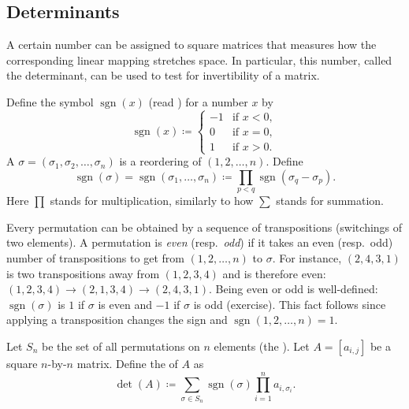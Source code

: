 \subsection{Determinants}

A certain number can be assigned to square matrices that measures
how the corresponding linear mapping stretches space.  In particular,
this number, called the determinant, can be used to test for invertibility of a matrix.

Define the symbol
$\operatorname{sgn}(x)$ (read ) for a number $x$ by
\begin{equation*}
\operatorname{sgn}(x)
\coloneqq
\begin{cases}
-1 & \text{if } x < 0 , \\
0  & \text{if } x = 0 , \\
1  & \text{if } x > 0 .
\end{cases}
\end{equation*}
A \emph{}
$\sigma = (\sigma_1,\sigma_2,\ldots,\sigma_n)$ is
a reordering of $(1,2,\ldots,n)$. 
Define
\begin{equation} \label{eq:sgndef}
\operatorname{sgn}(\sigma) = \operatorname{sgn}(\sigma_1,\ldots,\sigma_n)
\coloneqq 
\prod_{p < q} \operatorname{sgn}(\sigma_q-\sigma_p) .
\end{equation}
Here $\prod$ stands for multiplication, similarly to how $\sum$ stands for
summation.

Every permutation can be obtained by
a sequence of transpositions (switchings of two elements).
A permutation is
\emph{even}
(resp.\ \emph{odd})
if it takes an even (resp.\ odd) number of
transpositions to get from $(1,2,\ldots,n)$ to $\sigma$.
For instance, $(2,4,3,1)$ is two transpositions away from 
$(1,2,3,4)$ and is therefore even: $(1,2,3,4) \to (2,1,3,4) \to (2,4,3,1)$.
Being even or odd is well-defined:
$\operatorname{sgn}(\sigma)$ 
is $1$ if $\sigma$ is even and $-1$ if $\sigma$ is odd (exercise).
This fact follows since applying
a transposition changes the sign and
$\operatorname{sgn}(1,2,\ldots,n) = 1$.

Let $S_n$  be the set of all permutations on $n$ elements (the
\emph{}).
Let $A= [a_{i,j}]$ be a square $n$-by-$n$ matrix.
Define the \emph{} of $A$ as
\begin{equation*}
\det(A) \coloneqq 
\sum_{\sigma \in S_n}
\operatorname{sgn} (\sigma) \prod_{i=1}^n a_{i,\sigma_i} .
\end{equation*}

